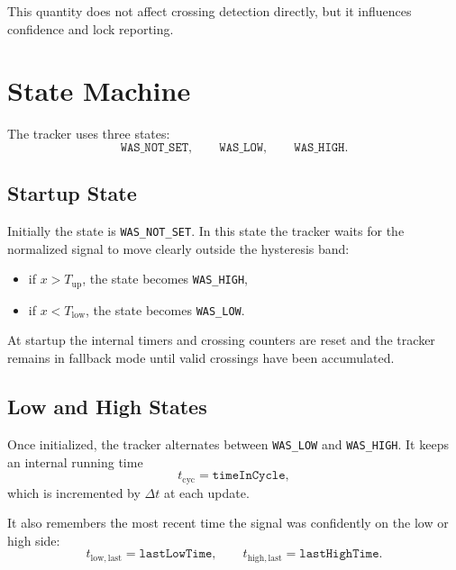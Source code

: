 \documentclass[conference]{IEEEtran}
\begin{document}
    This quantity does not affect crossing detection directly, but it influences
    confidence and lock reporting.

    \section{State Machine}

    The tracker uses three states:
    \begin{equation}
        \texttt{WAS\_NOT\_SET},\qquad
        \texttt{WAS\_LOW},\qquad
        \texttt{WAS\_HIGH}.
    \end{equation}

    \subsection{Startup State}

    Initially the state is \texttt{WAS\_NOT\_SET}. In this state the tracker waits
    for the normalized signal to move clearly outside the hysteresis band:
    \begin{itemize}[leftmargin=1.4em]
        \item if \(x > T_{\mathrm{up}}\), the state becomes \texttt{WAS\_HIGH},
        \item if \(x < T_{\mathrm{low}}\), the state becomes \texttt{WAS\_LOW}.
    \end{itemize}

    At startup the internal timers and crossing counters are reset and the tracker
    remains in fallback mode until valid crossings have been accumulated.

    \subsection{Low and High States}

    Once initialized, the tracker alternates between \texttt{WAS\_LOW} and
    \texttt{WAS\_HIGH}. It keeps an internal running time
    \begin{equation}
        t_{\mathrm{cyc}} = \texttt{timeInCycle},
    \end{equation}
    which is incremented by \(\Delta t\) at each update.

    It also remembers the most recent time the signal was confidently on the low
    or high side:
    \begin{equation}
        t_{\mathrm{low,last}} = \texttt{lastLowTime},
        \qquad
        t_{\mathrm{high,last}} = \texttt{lastHighTime}.
    \end{equation}
\end{document}
